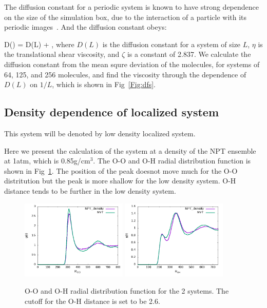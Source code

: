 \documentclass[prl,twocolumn,showpacs]{revtex4}
\begin{document}
The diffusion constant for a periodic system is known to have strong dependence on the size of the simulation box, due to the interaction of a particle with its periodic images~\cite{ZZZ}. And the diffusion constant obeys:

\bea
D(\infty) = D(L) + ,
\eea
where $D(L)$ is the diffusion constant for a system of size $L$, $\eta$ is the translational shear viscosity, and $\zeta$ is a constant of 2.837. We calculate the diffusion constant from the mean squre deviation of the molecules, for systems of 64, 125, and 256 molecules, and find the viscosity through the dependence of $D(L)$ on $1/L$, which is shown in Fig~\ref{Fig:dfs}. 

\subsection{Density dependence of localized system} 

This system will be denoted by low density localized system.

Here we present the calculation of the system at a density of the NPT ensemble at 1atm, which is 0.85g/cm$^3$. The O-O and O-H radial distribution function is shown in Fig~\ref{Fig:rdf_cp}. The position of the peak doesnot move much for the O-O distritution but the peak is more shallow for the low density system. O-H distance tends to be further in the low density system.

\begin{figure}
\includegraphics[width=0.45\textwidth]{rdf_NVT_CPDNVT}
\includegraphics[width=0.45\textwidth]{rdf_OH_NVT_CPDNPT}
\caption{O-O and O-H radial distribution function for the 2 systems. The cutoff for the O-H distance is set to be 2.6\Ang.}\label{Fig:rdf_cp}
\end{figure} 
\end{document}
